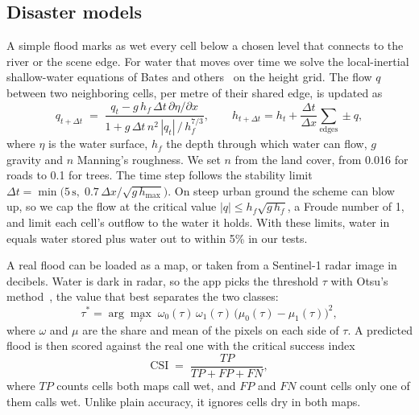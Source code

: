 \documentclass[11pt,a4paper]{article}
\begin{document}
\subsection{Disaster models}
A simple flood marks as wet every cell below a chosen level that connects to the river or the scene edge. For water that moves over time we solve the local-inertial shallow-water equations of Bates and others~\cite{bates2010inertial} on the height grid. The flow $q$ between two neighboring cells, per metre of their shared edge, is updated as
\begin{equation}
q_{t+\Delta t} \;=\; \frac{q_t - g\,h_f\,\Delta t\,\partial\eta/\partial x}{1 + g\,\Delta t\,n^2\,|q_t|\,/\,h_f^{7/3}},
\qquad
h_{t+\Delta t} = h_t + \frac{\Delta t}{\Delta x}\sum_{\text{edges}} \pm q ,
\label{eq:flow}
\end{equation}
where $\eta$ is the water surface, $h_f$ the depth through which water can flow, $g$ gravity and $n$ Manning's roughness. We set $n$ from the land cover, from 0.016 for roads to 0.1 for trees. The time step follows the stability limit $\Delta t = \min\bigl(5\,\mathrm{s},\; 0.7\,\Delta x/\sqrt{g\,h_{\max}}\bigr)$. On steep urban ground the scheme can blow up, so we cap the flow at the critical value $|q| \le h_f\sqrt{g\,h_f}$, a Froude number of 1, and limit each cell's outflow to the water it holds. With these limits, water in equals water stored plus water out to within 5\% in our tests.

A real flood can be loaded as a map, or taken from a Sentinel-1 radar image in decibels. Water is dark in radar, so the app picks the threshold $\tau$ with Otsu's method~\cite{otsu1979}, the value that best separates the two classes:
\begin{equation}
\tau^* = \arg\max_\tau\; \omega_0(\tau)\,\omega_1(\tau)\,\bigl(\mu_0(\tau)-\mu_1(\tau)\bigr)^2 ,
\label{eq:otsu}
\end{equation}
where $\omega$ and $\mu$ are the share and mean of the pixels on each side of $\tau$. A predicted flood is then scored against the real one with the critical success index
\begin{equation}
\mathrm{CSI} \;=\; \frac{TP}{TP+FP+FN},
\label{eq:csi}
\end{equation}
where $TP$ counts cells both maps call wet, and $FP$ and $FN$ count cells only one of them calls wet. Unlike plain accuracy, it ignores cells dry in both maps.
\end{document}
